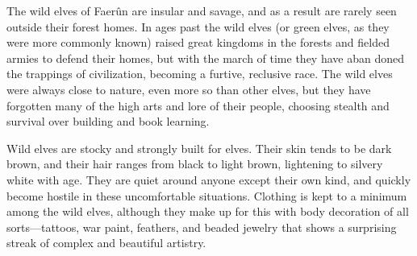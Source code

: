 
The wild elves of Faerûn are insular and savage, and as a result are rarely seen outside their forest homes. In ages past the wild elves (or green elves, as they were more commonly known) raised great kingdoms in the forests and fielded armies to defend their homes, but with the march of time they have aban doned the trappings of civilization, becoming a furtive, reclusive race. The wild elves were always close to nature, even more so than other elves, but they have forgotten many of the high arts and lore of their people, choosing stealth and survival over building and book learning.

Wild elves are stocky and strongly built for elves. Their skin tends to be dark brown, and their hair ranges from black to light brown, lightening to silvery white with age. They are quiet around anyone except their own kind, and quickly become hostile in these uncomfortable situations. Clothing is kept to a minimum among the wild elves, although they make up for this with body decoration of all sorts—tattoos, war paint, feathers, and beaded jewelry that shows a surprising streak of complex and beautiful artistry.

